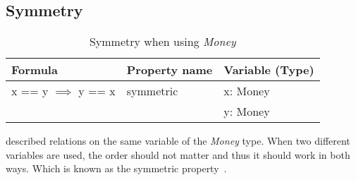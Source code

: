 \subsection*{Symmetry}
\label{ssct:properties_symmetry}
\FloatBarrier
\begin{table}[!ht]
\centering
\begin{tabular}{lll}
\hline
                        \textbf{Formula}         & \textbf{Property name} & \textbf{Variable (Type)} \\ \hline
\rowcolor[HTML]{EFEFEF} x == y $\implies$ y == x & symmetric              & x: Money                 \\
\rowcolor[HTML]{EFEFEF}                          &                        & y: Money                 \\ \hline
\end{tabular}
\caption{Symmetry when using \textit{Money}}
\label{tbl:ch4_money_symmetry}
\end{table}
\FloatBarrier
 described relations on the same variable
of the \textit{Money} type. When two different variables are used, the order
should not matter and thus it should work in both ways. Which is known as the
symmetric property~\cite{raftery2011perspective}.


